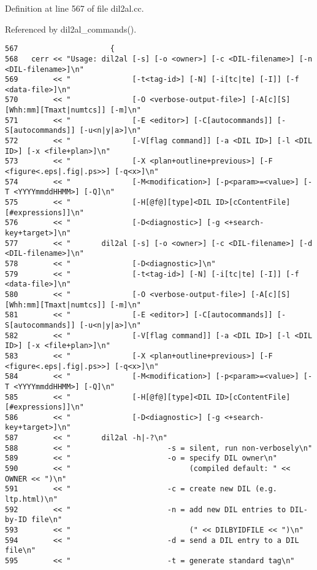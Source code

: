 Definition at line 567 of file dil2al.cc.

Referenced by dil2al\_\-commands().



\footnotesize\begin{verbatim}567                     {
568   cerr << "Usage: dil2al [-s] [-o <owner>] [-c <DIL-filename>] [-n <DIL-filename>]\n"
569        << "              [-t<tag-id>] [-N] [-i[tc|te] [-I]] [-f <data-file>]\n"
570        << "              [-O <verbose-output-file>] [-A[c][S][Whh:mm][Tmaxt|numtcs]] [-m]\n"
571        << "              [-E <editor>] [-C[autocommands]] [-S[autocommands]] [-u<n|y|a>]\n"
572        << "              [-V[flag command]] [-a <DIL ID>] [-l <DIL ID>] [-x <file+plan>]\n"
573        << "              [-X <plan+outline+previous>] [-F <figure<.eps|.fig|.ps>>] [-q<x>]\n"
574        << "              [-M<modification>] [-p<param>=<value>] [-T <YYYYmmddHHMM>] [-Q]\n"
575        << "              [-H[@f@][type]<DIL ID>[cContentFile][#expressions]]\n"
576        << "              [-D<diagnostic>] [-g <+search-key+target>]\n"
577        << "       dil2al [-s] [-o <owner>] [-c <DIL-filename>] [-d <DIL-filename>]\n"
578        << "              [-D<diagnostic>]\n"
579        << "              [-t<tag-id>] [-N] [-i[tc|te] [-I]] [-f <data-file>]\n"
580        << "              [-O <verbose-output-file>] [-A[c][S][Whh:mm][Tmaxt|numtcs]] [-m]\n"
581        << "              [-E <editor>] [-C[autocommands]] [-S[autocommands]] [-u<n|y|a>]\n"
582        << "              [-V[flag command]] [-a <DIL ID>] [-l <DIL ID>] [-x <file+plan>]\n"
583        << "              [-X <plan+outline+previous>] [-F <figure<.eps|.fig|.ps>>] [-q<x>]\n"
584        << "              [-M<modification>] [-p<param>=<value>] [-T <YYYYmmddHHMM>] [-Q]\n"
585        << "              [-H[@f@][type]<DIL ID>[cContentFile][#expressions]]\n"
586        << "              [-D<diagnostic>] [-g <+search-key+target>]\n"
587        << "       dil2al -h|-?\n"
588        << "                      -s = silent, run non-verbosely\n"
589        << "                      -o = specify DIL owner\n"
590        << "                           (compiled default: " << OWNER << ")\n"
591        << "                      -c = create new DIL (e.g. ltp.html)\n"
592        << "                      -n = add new DIL entries to DIL-by-ID file\n"
593        << "                           (" << DILBYIDFILE << ")\n"
594        << "                      -d = send a DIL entry to a DIL file\n"
595        << "                      -t = generate standard tag\n"

\end{verbatim}
